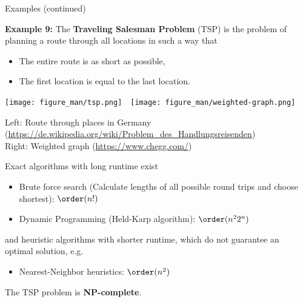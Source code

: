 \documentclass[11pt,compress,t,notes=noshow, xcolor=table]{beamer}
\begin{document}
\begin{vbframe}{Examples (continued)}


\framebreak


\textbf{Example 9:} The \textbf{Traveling Salesman Problem} (TSP) is the problem of planning a route through all locations in such a way that

\begin{itemize}
\item The entire route is as short as possible,
\item The first location is equal to the last location.
\end{itemize}

\vspace*{-0.2cm}

\begin{center}
  \texttt{[image: figure\_man/tsp.png]}~~\texttt{[image: figure\_man/weighted-graph.png]}
\end{center}
\vspace*{-0.2cm}

\begin{footnotesize}
Left: Route through places in Germany (\url{https://de.wikipedia.org/wiki/Problem_des_Handlungsreisenden}) \\
Right: Weighted graph (\url{https://www.chegg.com/})
\end{footnotesize}

\framebreak

Exact algorithms with long runtime exist

\begin{itemize}
  \item Brute force search (Calculate lengths of all possible round trips and choose shortest): $\order(n!)$
  \item Dynamic Programming (Held-Karp algorithm): $\order(n^22^n)$
\end{itemize}

and heuristic algorithms with shorter runtime, which do not guarantee an optimal solution, e.g.

\begin{itemize}
  \item Nearest-Neighbor heuristics: $\order(n^2)$
\end{itemize}

The TSP problem is \textbf{NP-complete}.

\end{vbframe}
\end{document}
